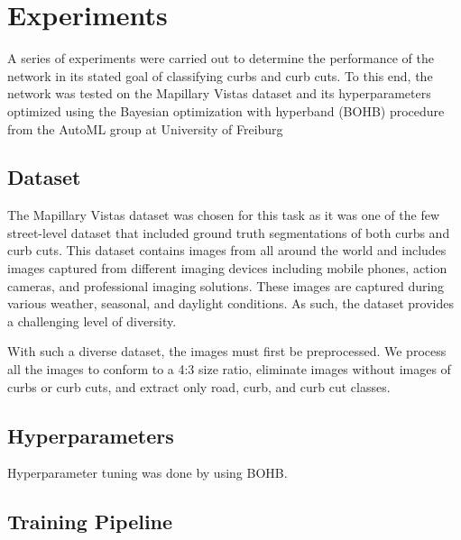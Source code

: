 \chapter{Experiments}\label{chap:experiments}
A series of experiments were carried out to determine the performance of the network in its stated goal of classifying curbs and curb cuts. To this end, the network was tested on the Mapillary Vistas dataset \cite{mapillary} and its hyperparameters optimized using the Bayesian optimization with hyperband (BOHB) procedure from the AutoML group at University of Freiburg \cite{bohb}

\section{Dataset} \label{section:experiments-dataset}
The Mapillary Vistas dataset was chosen for this task as it was one of the few street-level dataset that included ground truth segmentations of both curbs and curb cuts.
This dataset contains images from all around the world and includes images captured from different imaging devices including mobile phones, action cameras, and professional imaging solutions.
These images are captured during various weather, seasonal, and daylight conditions.
As such, the dataset provides a challenging level of diversity.

With such a diverse dataset, the images must first be preprocessed.
We process all the images to conform to a 4:3 size ratio, eliminate images without images of curbs or curb cuts, and extract only road, curb, and curb cut classes. 

\section{Hyperparameters} \label{section:experiments-hyperparameters}
Hyperparameter tuning was done by using BOHB.

\section{Training Pipeline} \label{section:experiments-trainingpipeline}

